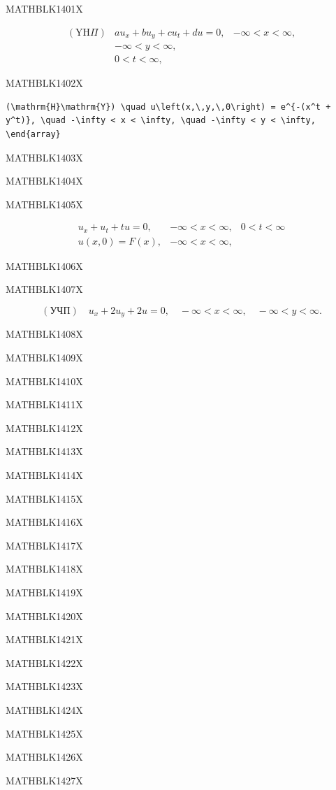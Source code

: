 \documentclass[
  ukrainian,
]{article}
\begin{document}
MATHBLK1401X

\[
\begin{array}{ll} (\mathrm{Y}\mathrm{H}\Pi) & au_x + bu_y + cu_t + du = 0, & -\infty < x < \infty, \\ & -\infty < y < \infty, \\ & 0 < t < \infty, \end{array}
\]

MATHBLK1402X

\begin{verbatim}
(\mathrm{H}\mathrm{Y}) \quad u\left(x,\,y,\,0\right) = e^{-(x^t + y^t)}, \quad -\infty < x < \infty, \quad -\infty < y < \infty, \end{array}
\end{verbatim}

MATHBLK1403X

MATHBLK1404X

MATHBLK1405X

\[
\begin{array}{ll} u_x + u_t + tu = 0, & -\infty < x < \infty, & 0 < t < \infty \\ u(x, 0) = F(x), & -\infty < x < \infty, & \end{array}
\]

MATHBLK1406X

MATHBLK1407X

\[
(\text{УЧП}) \quad u_x + 2u_y + 2u = 0, \quad -\infty < x < \infty, \quad -\infty < y < \infty.
\]

MATHBLK1408X

MATHBLK1409X

MATHBLK1410X

MATHBLK1411X

MATHBLK1412X

MATHBLK1413X

MATHBLK1414X

MATHBLK1415X

MATHBLK1416X

MATHBLK1417X

MATHBLK1418X

MATHBLK1419X

MATHBLK1420X

MATHBLK1421X

MATHBLK1422X

MATHBLK1423X

MATHBLK1424X

MATHBLK1425X

MATHBLK1426X

MATHBLK1427X
\end{document}
